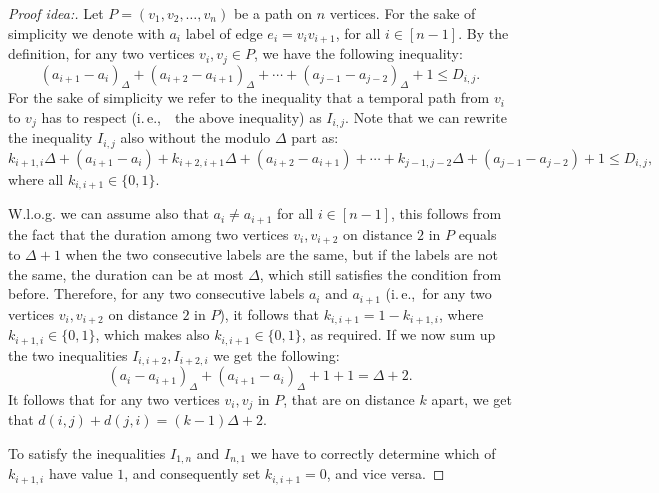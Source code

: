 \documentclass[a4paper,UKenglish,cleveref, autoref, thm-restate]{lipics-v2021}
\newcommand{\ie}{i.\,e.,\ }
\begin{document}
\begin{proof}[Proof idea:]
	Let $P = (v_1, v_2, \dots, v_n)$ be a path on $n$ vertices.
	For the sake of simplicity we denote with $a_i$ label of edge $e_i =v_iv_{i+1}$, for all $i \in [n-1]$.
	By the definition, for any two vertices $v_i,v_j \in P$, we have the following inequality:
	\begin{equation*}
		(a_{i+1} - a_i)_\Delta + (a_{i+2} - a_{i+1})_\Delta + \cdots + (a_{j-1} - a_{j-2})_\Delta + 1
		\leq D_{i,j}.
	\end{equation*}
	For the sake of simplicity we refer to the inequality that a temporal path from $v_i$ to $v_j$ has to respect (\ie~the above inequality) 
	as $I_{i,j}$.
	Note that we can rewrite the inequality $I_{i,j}$ also without the modulo $\Delta$ part as:
	\begin{equation*}
		k_{i+1,i} \Delta + (a_{i+1} - a_i)+ k_{i+2,i+1} \Delta + (a_{i+2} - a_{i+1}) + \cdots + k_{j-1,j-2} \Delta + (a_{j-1} - a_{j-2})+ 1
		\leq D_{i,j},
	\end{equation*}
	where all $k_{i,i+1} \in \{0,1\}$.
	
	W.l.o.g. we can assume also that $a_i \neq a_{i+1}$ for all $i \in [n-1]$,
	this follows from the fact that the duration among two vertices $v_i, v_{i+2}$ on distance $2$ in $P$ equals to $\Delta + 1$ when the two consecutive labels are the same, but if the labels are not the same, the duration can be at most $\Delta$, which still satisfies the condition from before.
	Therefore, for any two consecutive labels $a_i$ and $a_{i+1}$ (\ie for any two vertices $v_i, v_{i+2}$ on distance $2$ in $P$), 
	it follows that 
	$k_{i, i+1} = 1 - k_{i+1,i}$, where $k_{i+1,i} \in \{0,1\}$, which makes also $k_{i,i+1} \in \{0,1\}$, as required.
	If we now sum up the two inequalities $I_{i,i+2}, I_{i+2,i}$ we get the following:
	\begin{equation*}
		(a_i-a_{i+1})_\Delta + (a_{i+1}-a_i)_\Delta +1 +1 = \Delta + 2.
	\end{equation*}
	It follows that for any two vertices $v_i, v_j$ in $P$, that are on distance $k$ apart, 
	we get that $d(i,j) + d(j,i) = (k-1) \Delta + 2$.
	
	To satisfy the inequalities $I_{1,n}$ and $I_{n,1}$ we have to correctly determine which of $k_{i+1,i}$ have value $1$, and consequently set $k_{i,i+1} = 0$,
	and vice versa.
	

\end{proof}
\end{document}
